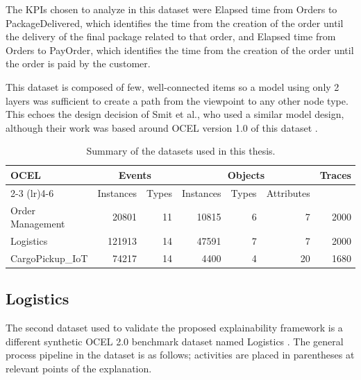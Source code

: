     		The KPIs chosen to analyze in this dataset were Elapsed time from Orders to PackageDelivered, which identifies the time from the creation of the order until the delivery of the final package related to that order, and Elapsed time from Orders to PayOrder, which identifies the time from the creation of the order until the order is paid by the customer.
    
    		This dataset is composed of few, well-connected items so a model using only 2 layers was sufficient to create a path from the viewpoint to any other node type. This echoes the design decision of Smit et al., who used a similar model design, although their work was based around OCEL version 1.0 of this dataset \cite{smit2024}.
            
    \begin{table}[t!]
        \centering
        \caption{Summary of the datasets used in this thesis.}
        \label{tab:dataset_summary}
        \begin{tabular}{lrrrrrr}
            \toprule
            \multirow{2}{*}{OCEL} & \multicolumn{2}{c}{Events} & \multicolumn{3}{c}{Objects} & \multirow{2}{*}{Traces}\\
            \cmidrule(lr){2-3} \cmidrule(lr){4-6}
             & Instances & Types & Instances & Types & Attributes &  \\
            \midrule
            Order Management & 20801 & 11 & 10815 & 6 & 7 & 2000\\
            Logistics & 121913 & 14 & 47591 & 7 & 7 & 2000\\
            CargoPickup\_IoT & 74217 & 14 & 4400 & 4 & 20 & 1680\\
            \bottomrule
        \end{tabular}
        \end{table}
    
	\subsection{Logistics}
    \label{sec:dataset_logistics}
		The second dataset used to validate the proposed explainability framework is a different synthetic OCEL 2.0 benchmark dataset named Logistics \cite{knopp2023b}. The general process pipeline in the dataset is as follows; activities are placed in parentheses at relevant points of the explanation.


